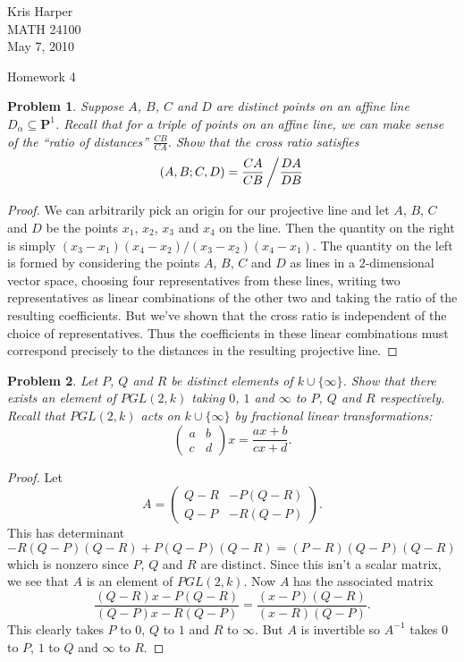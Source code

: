 \documentclass{article}
\newtheorem{problem}{Problem}
\begin{document}
\begin{flushright}
Kris Harper\\

MATH 24100\\

May 7, 2010
\end{flushright}

\begin{center}
Homework 4
\end{center}

\begin{problem}
Suppose $A$, $B$, $C$ and $D$ are distinct points on an affine line $D_{\alpha} \subseteq \mathbf{P}^1$. Recall that for a triple of points on an affine line, we can make sense of the ``ratio of distances'' $\frac{CB}{CA}$. Show that the cross ratio satisfies
\[
(A,B;C,D) = \frac{CA}{CB} \left /\frac{DA}{DB} \right .
\]
\end{problem}
\begin{proof}
We can arbitrarily pick an origin for our projective line and let $A$, $B$, $C$ and $D$ be the points $x_1$, $x_2$, $x_3$ and $x_4$ on the line. Then the quantity on the right is simply $(x_3-x_1)(x_4-x_2)/(x_3-x_2)(x_4-x_1)$. The quantity on the left is formed by considering the points $A$, $B$, $C$ and $D$ as lines in a $2$-dimensional vector space, choosing four representatives from these lines, writing two representatives as linear combinations of the other two and taking the ratio of the resulting coefficients. But we've shown that the cross ratio is independent of the choice of representatives. Thus the coefficients in these linear combinations must correspond precisely to the distances in the resulting projective line.
\end{proof}

\begin{problem}
Let $P$, $Q$ and $R$ be distinct elements of $k \cup \{\infty\}$. Show that there exists an element of $PGL(2,k)$ taking $0$, $1$ and $\infty$ to $P$, $Q$ and $R$ respectively. Recall that $PGL(2,k)$ acts on $k \cup \{\infty\}$ by fractional linear transformations:
\[
\left (
\begin{array}{cc}
a & b\\
c & d
\end{array}
\right )
x =
\frac{ax + b}{cx+d}.
\]
\end{problem}
\begin{proof}
Let
\[
A =
\left (
\begin{array}{cc}
Q-R & -P(Q-R)\\
Q-P & -R(Q-P)
\end{array}
\right).
\]
This has determinant $-R(Q-P)(Q-R) + P(Q-P)(Q-R) = (P-R)(Q-P)(Q-R)$ which is nonzero since $P$, $Q$ and $R$ are distinct. Since this isn't a scalar matrix, we see that $A$ is an element of $PGL(2,k)$. Now $A$ has the associated matrix
\[
\frac{(Q-R)x - P(Q-R)}{(Q-P)x - R(Q-P)} = \frac{(x-P)(Q-R)}{(x-R)(Q-P)}.
\]
This clearly takes $P$ to $0$, $Q$ to $1$ and $R$ to $\infty$. But $A$ is invertible so $A^{-1}$ takes $0$ to $P$, $1$ to $Q$ and $\infty$ to $R$.
\end{proof}
\end{document}
